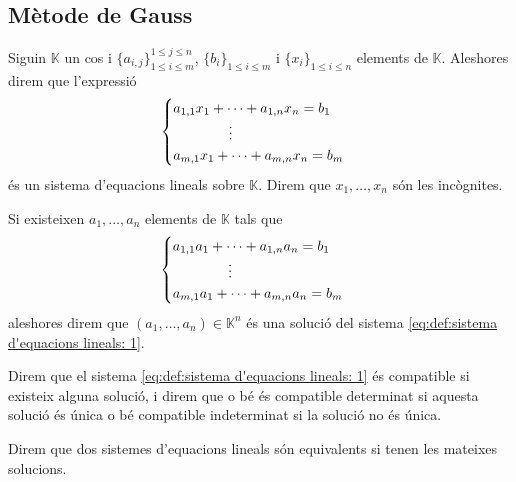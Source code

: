 \documentclass[../Apunts.tex]{subfiles}
\begin{document}
	\subsection{Mètode de Gauss}
	\begin{definition}
		\label{def:sistema d'equacions lineals}
		Siguin \(\mathbb{K}\) un cos i \(\{a_{i,j}\}_{1\leq i\leq m}^{1\leq j\leq n}\), \(\{b_{i}\}_{1\leq i\leq m}\) i \(\{x_{i}\}_{1\leq i\leq n}\) elements de \(\mathbb{K}\). Aleshores direm que l'expressió
		\begin{equation}
		\label{eq:def:sistema d'equacions lineals: 1}
		\begin{cases}
		a_{1,1}x_{1}+\dots+a_{1,n}x_{n}=b_{1}\\
		\hfill\vdots\hfill\hfill\\
		a_{m,1}x_{1}+\dots+a_{m,n}x_{n}=b_{m}
		\end{cases}
		\end{equation}
		és un sistema d'equacions lineals sobre \(\mathbb{K}\). Direm que \(x_{1},\dots,x_{n}\) són les incògnites.
		
		Si existeixen \(a_{1},\dots,a_{n}\) elements de \(\mathbb{K}\) tals que
		\[\begin{cases}
		a_{1,1}a_{1}+\dots+a_{1,n}a_{n}=b_{1} \\
		\hfill\vdots\hfill\hfill\\
		a_{m,1}a_{1}+\dots+a_{m,n}a_{n}=b_{m}
		\end{cases}\]
		aleshores direm que \((a_{1},\dots,a_{n})\in\mathbb{K}^{n}\) és una solució del sistema \eqref{eq:def:sistema d'equacions lineals: 1}.
		
		Direm que el sistema \eqref{eq:def:sistema d'equacions lineals: 1} és compatible si existeix alguna solució, i direm que o bé és compatible determinat si aquesta solució és única o bé compatible indeterminat si la solució no és única.
		
		Direm que dos sistemes d'equacions lineals són equivalents si tenen les mateixes solucions.
	\end{definition}
\end{document}
